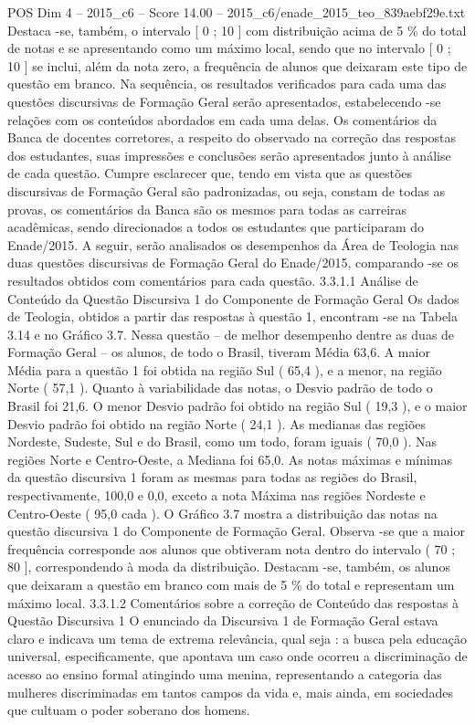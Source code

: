 \begin{textsample}{POS Dim 4 – 2015\_c6 – Score 14.00 – 2015\_c6/enade\_2015\_teo\_839aebf29e.txt}
Destaca -se, também, o intervalo [ 0 ; 10 ] com distribuição acima de 5 \% do total de notas e se apresentando como um máximo local, sendo que no intervalo [ 0 ; 10 ] se inclui, além da nota zero, a frequência de alunos que deixaram este tipo de questão em branco.
Na sequência, os resultados verificados para cada uma das questões discursivas de Formação Geral serão apresentados, estabelecendo -se relações com os conteúdos abordados em cada uma delas.
Os comentários da Banca de docentes corretores, a respeito do observado na correção das respostas dos estudantes, suas impressões e conclusões serão apresentados junto à análise de cada questão.
Cumpre esclarecer que, tendo em vista que as questões discursivas de Formação Geral são padronizadas, ou seja, constam de todas as provas, os comentários da Banca são os mesmos para todas as carreiras acadêmicas, sendo direcionados a todos os estudantes que participaram do Enade/2015.
A seguir, serão analisados os desempenhos da Área de Teologia nas duas questões discursivas de Formação Geral do Enade/2015, comparando -se os resultados obtidos com comentários para cada questão. 3.3.1.1 Análise de Conteúdo da Questão Discursiva 1 do Componente de Formação Geral Os dados de Teologia, obtidos a partir das respostas à questão 1, encontram -se na Tabela 3.14 e no Gráfico 3.7.
Nessa questão – de melhor desempenho dentre as duas de Formação Geral – os alunos, de todo o Brasil, tiveram Média 63,6.
A maior Média para a questão 1 foi obtida na região Sul ( 65,4 ), e a menor, na região Norte ( 57,1 ).
Quanto à variabilidade das notas, o Desvio padrão de todo o Brasil foi 21,6.
O menor Desvio padrão foi obtido na região Sul ( 19,3 ), e o maior Desvio padrão foi obtido na região Norte ( 24,1 ).
As medianas das regiões Nordeste, Sudeste, Sul e do Brasil, como um todo, foram iguais ( 70,0 ).
Nas regiões Norte e Centro-Oeste, a Mediana foi 65,0.
As notas máximas e mínimas da questão discursiva 1 foram as mesmas para todas as regiões do Brasil, respectivamente, 100,0 e 0,0, exceto a nota Máxima nas regiões Nordeste e Centro-Oeste ( 95,0 cada ).
O Gráfico 3.7 mostra a distribuição das notas na questão discursiva 1 do Componente de Formação Geral.
Observa -se que a maior frequência corresponde aos alunos que obtiveram nota dentro do intervalo ( 70 ; 80 ], correspondendo à moda da distribuição.
Destacam -se, também, os alunos que deixaram a questão em branco com mais de 5 \% do total e representam um máximo local. 3.3.1.2 Comentários sobre a correção de Conteúdo das respostas à Questão Discursiva 1 O enunciado da Discursiva 1 de Formação Geral estava claro e indicava um tema de extrema relevância, qual seja : a busca pela educação universal, especificamente, que apontava um caso onde ocorreu a discriminação de acesso ao ensino formal atingindo uma menina, representando a categoria das mulheres discriminadas em tantos campos da vida e, mais ainda, em sociedades que cultuam o poder soberano dos homens.

\end{textsample}
